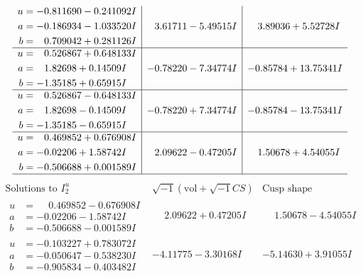 \documentclass[1p]{elsarticle_modified}
\theoremstyle{definition}
\newcommand{\I}{\sqrt{-1}}
\begin{document}
$$\begin{array}{c|c|c}
\begin{aligned}
u &= -0.811690 - 0.241092 I \\
a &= -0.186934 - 1.033520 I \\
b &= \phantom{-}0.709042 + 0.281126 I\end{aligned}
 & \phantom{-}3.61711 - 5.49515 I & \phantom{-}3.89036 + 5.52728 I \\ \hline\begin{aligned}
u &= \phantom{-}0.526867 + 0.648133 I \\
a &= \phantom{-}1.82698 + 0.14509 I \\
b &= -1.35185 + 0.65915 I\end{aligned}
 & -0.78220 - 7.34774 I & -0.85784 + 13.75341 I \\ \hline\begin{aligned}
u &= \phantom{-}0.526867 - 0.648133 I \\
a &= \phantom{-}1.82698 - 0.14509 I \\
b &= -1.35185 - 0.65915 I\end{aligned}
 & -0.78220 + 7.34774 I & -0.85784 - 13.75341 I \\ \hline\begin{aligned}
u &= \phantom{-}0.469852 + 0.676908 I \\
a &= -0.02206 + 1.58742 I \\
b &= -0.506688 + 0.001589 I\end{aligned}
 & \phantom{-}2.09622 - 0.47205 I & \phantom{-}1.50678 + 4.54055 I\\
 \hline 
 \end{array}$$\newpage$$\begin{array}{c|c|c}  
\text{Solutions to }I^u_{2}& \I (\text{vol} + \sqrt{-1}CS) & \text{Cusp shape}\\
 \hline 
\begin{aligned}
u &= \phantom{-}0.469852 - 0.676908 I \\
a &= -0.02206 - 1.58742 I \\
b &= -0.506688 - 0.001589 I\end{aligned}
 & \phantom{-}2.09622 + 0.47205 I & \phantom{-}1.50678 - 4.54055 I \\ \hline\begin{aligned}
u &= -0.103227 + 0.783072 I \\
a &= -0.050647 - 0.538230 I \\
b &= -0.905834 - 0.403482 I\end{aligned}
 & -4.11775 - 3.30168 I & -5.14630 + 3.91055 I \\ \hline\begin{aligned}

\end{aligned}
\end{array}$$
\end{document}
